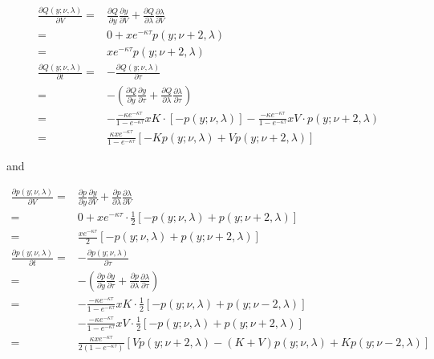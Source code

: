 \begin{equation}\label{ccdf diff2}
    \begin{aligned}
        \frac{\partial Q(y; \nu, \lambda)}{\partial V}=& \frac{\partial Q}{\partial y}\frac{\partial y}{\partial V} + \frac{\partial Q}{\partial \lambda} \frac{\partial \lambda}{\partial V} \\
        =&0 + x e^{-\kappa \tau} p(y ; \nu+2, \lambda)\\
        =& x e^{-\kappa \tau} p(y ; \nu+2, \lambda) \\
        \frac{\partial Q(y; \nu, \lambda)}{\partial t}=& -\frac{\partial Q(y; \nu, \lambda)}{\partial \tau}\\
        =&-\left(\frac{\partial Q}{\partial y}\frac{\partial y}{\partial \tau} + \frac{\partial Q}{\partial \lambda} \frac{\partial \lambda}{\partial \tau}\right) \\
        =& -\frac{-\kappa e^{-\kappa \tau}}{1 - e^{-\kappa \tau}}xK \cdot  [-p(y;\nu,\lambda)]-\frac{-\kappa e^{-\kappa \tau}}{1 - e^{-\kappa \tau}}xV \cdot p(y;\nu+2,\lambda)\\
        =& \frac{\kappa x e^{-\kappa  \tau}}{1 - e^{-\kappa \tau}} \left[-Kp(y;\nu,\lambda) + Vp(y;\nu+2,\lambda)\right]
    \end{aligned}
\end{equation}

and

\begin{equation}\label{pdf diff2}
    \begin{aligned}
        \frac{\partial p(y;\nu,\lambda)}{\partial V} =& \frac{\partial p}{\partial y}\frac{\partial y}{\partial V} + \frac{\partial p}{\partial \lambda} \frac{\partial \lambda}{\partial V} \\
        =& 0+ x e^{-\kappa \tau} \cdot \frac{1}{2} [-p(y; \nu, \lambda)+p(y ; \nu+2, \lambda)]\\
        =& \frac{x e^{-\kappa \tau}}{2} [-p(y ; \nu, \lambda)+p(y ; \nu+2, \lambda)] \\
        \frac{\partial p(y; \nu, \lambda)}{\partial t}=& -\frac{\partial p(y; \nu, \lambda)}{\partial \tau}\\
        =&-\left(\frac{\partial p}{\partial y}\frac{\partial y}{\partial \tau} + \frac{\partial p}{\partial \lambda} \frac{\partial \lambda}{\partial \tau}\right) \\
        =& -\frac{-\kappa e^{-\kappa \tau}}{1 - e^{-\kappa \tau}}xK \cdot  \frac{1}{2}[-p(y ; \nu, \lambda)+p(y ; \nu-2, \lambda)]\\
         &-\frac{-\kappa e^{-\kappa \tau}}{1 - e^{-\kappa \tau}}xV \cdot \frac{1}{2}[-p(y ; \nu, \lambda)+p(y ; \nu+2, \lambda)]\\
        =& \frac{\kappa x e^{-\kappa \tau}}{2(1 - e^{-\kappa \tau})} \left[Vp(y ; \nu+2, \lambda) - (K+V) p(y; \nu, \lambda) + K p(y; \nu-2, \lambda)\right]\\
    \end{aligned}
\end{equation}

